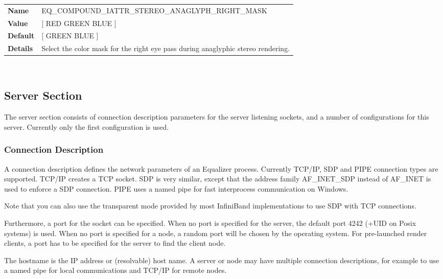 \documentclass[10pt,a4]{scrartcl}
\begin{document}
\begin{center}
\begin{tabularx}{\textwidth}{|l|X|}
  \hline
  \textbf{Name} & EQ\_COMPOUND\_IATTR\_STEREO\_ANAGLYPH\_RIGHT\_MASK\\
  \textbf{Value} & [ RED GREEN BLUE ]\\
  \textbf{Default} & [ GREEN BLUE ]\\
  \textbf{Details} & Select the color mask for the right eye pass during
  anaglyphic stereo rendering.\\
  \hline
\end{tabularx}\\%
\end{center}

\subsection{Server Section}

The server section consists of connection description parameters for the
server listening sockets, and a number of configurations for this
server. Currently only the first configuration is used.

\subsubsection{\label{sConnectionDescription}Connection Description}

A connection description defines the network parameters of an Equalizer
process. Currently TCP/IP, SDP and PIPE connection types are
supported. TCP/IP creates a TCP socket. SDP is very similar, except that
the address family \textsf{AF\_INET\_SDP} instead of \textsf{AF\_INET}
is used to enforce a SDP connection. PIPE uses a named pipe for fast
interprocess communication on Windows.

Note that you can also use the transparent mode provided by most
InfiniBand implementations to use SDP with TCP connections.

Furthermore, a port for the socket can be specified. When no port is
specified for the server, the default port 4242 (+UID on Posix systems)
is used. When no port is specified for a node, a random port will be
chosen by the operating system. For pre-launched render clients, a port
has to be specified for the server to find the client node.

The hostname is the IP address or (resolvable) host name. A server or
node may have multiple connection descriptions, for example to use a
named pipe for local communications and TCP/IP for remote nodes.
\end{document}
